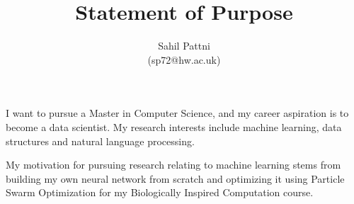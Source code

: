 \documentclass[a4paper,11pt]{article}
\begin{document}
\title{Statement of Purpose}
\author{Sahil Pattni\\(sp72@hw.ac.uk)}
\date{}
\maketitle

I want to pursue a Master in Computer Science, and my career aspiration is to become a data scientist. My research interests include machine learning, data structures and natural language processing.

My motivation for pursuing research relating to machine learning stems from building my own neural network from scratch and optimizing it using Particle Swarm Optimization for my Biologically Inspired Computation course.
\end{document}
